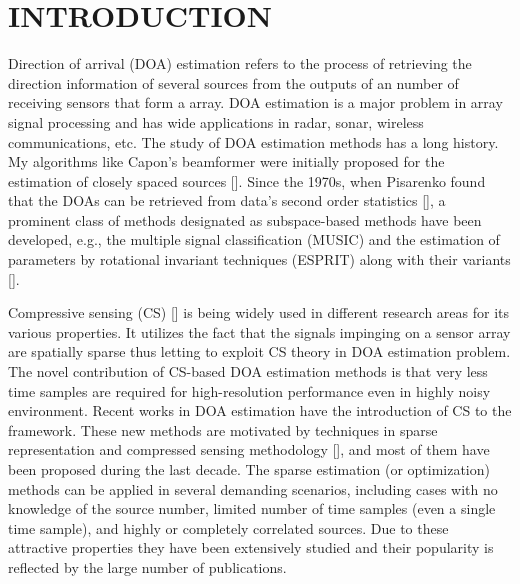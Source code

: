 \documentclass[12pt,a4paper]{article}
\theoremstyle{plain}
\theoremstyle{definition}
\begin{document}


\newpage
\section{INTRODUCTION}%
Direction of arrival (DOA) estimation refers to the process of retrieving the direction information of several sources from the outputs of an number of receiving sensors that form a array. DOA estimation is a major problem in array signal processing and has wide applications in radar, sonar, wireless communications, etc. The study of DOA estimation methods has a long history. My algorithms like Capon’s beamformer were initially proposed for the estimation of closely spaced sources [\citet{R1}]. Since the 1970s, when Pisarenko found that the DOAs can be retrieved from data's second order statistics [\citet{R2}], a prominent class of methods designated as subspace-based methods have been developed, e.g., the multiple signal classification (MUSIC) and the estimation of parameters by rotational invariant techniques (ESPRIT) along with their variants [\citet{R3,R4,R5,R6,R7}].

Compressive sensing (CS) [\citet{R8,R9}] is being widely used in different research areas for its various properties. It utilizes the fact that the signals impinging on a sensor array are spatially sparse thus letting to exploit CS theory in DOA estimation problem. The novel contribution of CS-based DOA estimation methods is that very less time samples are required for high-resolution performance even in highly noisy environment. Recent works in DOA estimation have the introduction of CS to the framework. These new methods are motivated by techniques in sparse representation and compressed sensing methodology [\citet{R10,R11,R12}], and most of them have been proposed during the last decade. The sparse estimation (or optimization) methods can be applied in several demanding scenarios, including cases with no knowledge of the source number, limited number of time samples (even a single time sample), and highly or completely correlated sources. Due to these attractive properties they have been extensively studied and their popularity is reflected by the large number of publications.
\end{document}

